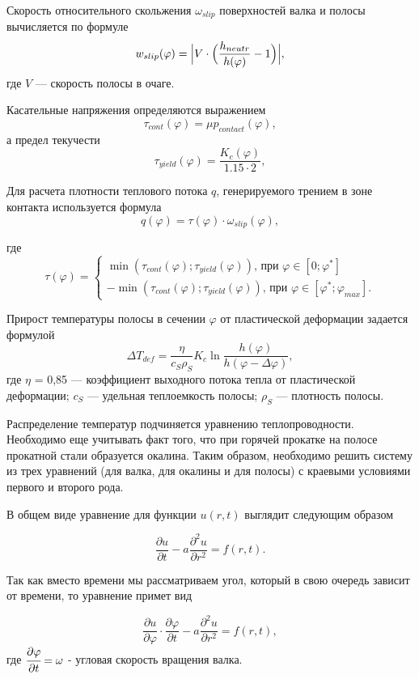 Скорость относительного скольжения $\omega_{slip}$ поверхностей валка и полосы вычисляется по формуле 
$$w_{slip}(\varphi) = \Bigl|V\cdot \Bigl(\frac{h_{neutr}}{h(\varphi)} - 1\Bigr)\Bigr|,$$
 где $V$ — скорость полосы
в очаге. 

Касательные напряжения определяются выражением 
\begin{equation}
\tau_{cont}(\varphi) = \mu  p_{contact}(\varphi),
\end{equation}
а предел текучести
\begin{equation}
\tau_{yield}(\varphi) = \frac{K_c(\varphi)}{1.15 \cdot 2},
\end{equation}

Для расчета плотности теплового потока $q$, генерируемого трением в зоне контакта
используется формула 
\begin{equation}
q(\varphi) = \tau(\varphi)\cdot \omega_{slip}(\varphi),
\end{equation}

где 
$$
\tau(\varphi) = 
\begin{cases} 
\min{(\tau_{cont}(\varphi);\tau_{yield}(\varphi))} \text{, при } \varphi \in [0; \varphi^*]
 \\ 
-\min{(\tau_{cont}(\varphi);\tau_{yield}(\varphi))} \text{, при } \varphi \in [\varphi^*; \varphi_{max}].
\end{cases} 
$$

Прирост температуры полосы в сечении $\varphi$ от пластической деформации задается формулой 
$$\Delta T_{def} = \frac{\eta}{c_S \rho_S} K_c \ln \frac{h(\varphi)}{h(\varphi - \Delta \varphi)},$$ 
где $\eta$ = 0,85 — коэффициент выходного потока тепла от пластической деформации; $c_S$ — удельная теплоемкость полосы; $\rho_S$ — плотность полосы.

Распределение температур подчиняется уравнению теплопроводности. Необходимо еще учитывать факт того, что при горячей прокатке на полосе прокатной стали образуется окалина. Таким образом, необходимо решить систему из трех уравнений (для валка, для окалины и для полосы) с краевыми условиями первого и второго рода.

В общем виде уравнение для функции $u(r, t)$ выглядит следующим образом

$$\frac{\partial u}{\partial t} - a \frac{\partial^2u}{\partial r^2} = f(r, t).$$

Так как вместо времени мы рассматриваем угол, который в свою очередь зависит от времени, то уравнение примет вид

$$\frac{\partial u}{\partial \varphi} \cdot \frac{\partial \varphi}{\partial t} - a \frac{\partial^2u}{\partial r^2} = f(r, t),$$
где $\cfrac{\partial \varphi}{\partial t} = \omega$ - угловая скорость вращения валка.

